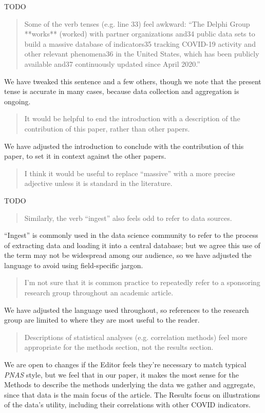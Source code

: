 \documentclass[11pt]{article}
\begin{document}
TODO

\begin{quote}
  Some of the verb tenses (e.g. line 33) feel awkward: ``The Delphi Group
  **works** (worked) with partner organizations and34 public data sets to build
  a massive database of indicators35 tracking COVID-19 activity and other
  relevant phenomena36 in the United States, which has been publicly available
  and37 continuously updated since April 2020.''
\end{quote}

We have tweaked this sentence and a few others, though we note that the present
tense is accurate in many cases, because data collection and aggregation is
ongoing.

\begin{quote}
  It would be helpful to end the introduction with a description of the
  contribution of this paper, rather than other papers.
\end{quote}

We have adjusted the introduction to conclude with the contribution of this
paper, to set it in context against the other papers.

\begin{quote}
  I think it would be useful to replace ``massive'' with a more precise
  adjective unless it is standard in the literature.
\end{quote}

TODO

\begin{quote}
  Similarly, the verb ``ingest'' also feels odd to refer to data sources.
\end{quote}

``Ingest'' is commonly used in the data science community to refer to the
process of extracting data and loading it into a central database; but we agree
this use of the term may not be widespread among our audience, so we have
adjusted the language to avoid using field-specific jargon.

\begin{quote}
  I'm not sure that it is common practice to repeatedly refer to a sponsoring
  research group throughout an academic article.
\end{quote}

We have adjusted the language used throughout, so references to the research
group are limited to where they are most useful to the reader.

\begin{quote}
  Descriptions of statistical analyses (e.g. correlation methods) feel more
  appropriate for the methods section, not the results section.
\end{quote}
We are open to changes if the Editor feels they're necessary to match typical
\textit{PNAS} style, but we feel that in our paper, it makes the most sense for
the Methods to describe the methods underlying the data we gather and aggregate,
since that data is the main focus of the article. The Results focus on
illustrations of the data's utility, including their correlations with other
COVID indicators.
\end{document}
